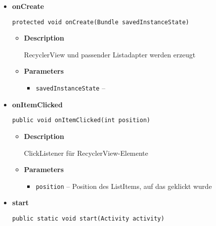 \documentclass[11pt,a4paper]{report}
\begin{document}
{{{{{{{{{{{{{{\begin{itemize}
{\begin{itemize}
{ClickListener für addGroupButton
}
\item{
{\bf  Parameters}
  \begin{itemize}
   \item{
\texttt{v} -- }
  \end{itemize}
}%
\end{itemize}
}%
\item{ 
\hypertarget{edu.kit.pse17.go_app.GroupListActivity.onCreate(Bundle)}{{\bf  onCreate}\\}
\begin{lstlisting}[frame=none]
protected void onCreate(Bundle savedInstanceState)\end{lstlisting} %
\begin{itemize}
\item{
{\bf  Description}

RecyclerView und passender Listadapter werden erzeugt
}
\item{
{\bf  Parameters}
  \begin{itemize}
   \item{
\texttt{savedInstanceState} -- }
  \end{itemize}
}%
\end{itemize}
}%
\item{ 
\hypertarget{edu.kit.pse17.go_app.GroupListActivity.onItemClicked(int)}{{\bf  onItemClicked}\\}
\begin{lstlisting}[frame=none]
public void onItemClicked(int position)\end{lstlisting} %
\begin{itemize}
\item{
{\bf  Description}

ClickListener für RecyclerView-Elemente
}
\item{
{\bf  Parameters}
  \begin{itemize}
   \item{
\texttt{position} -- Position des ListItems, auf das geklickt wurde}
  \end{itemize}
}%
\end{itemize}
}%
\item{ 
\hypertarget{edu.kit.pse17.go_app.GroupListActivity.start(Activity)}{{\bf  start}\\}
\begin{lstlisting}[frame=none]
public static void start(Activity activity)\end{lstlisting} %
}%
\end{itemize}
}
}
}}}}}}}}}}}}
\end{document}

